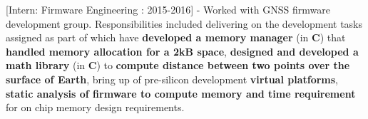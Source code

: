 \noindent \textcolor{ultramarine}{[Intern: Firmware Engineering : 2015-2016]} - Worked with GNSS firmware development group. Responsibilities included delivering on the development tasks assigned as part of which have \textbf{developed a memory manager} (in \textbf{C}) that \textbf{handled memory allocation for a 2kB space}, \textbf{designed and developed a math library} (in \textbf{C}) to \textbf{compute distance between two points over the surface of Earth}, bring up of pre-silicon development \textbf{virtual platforms}, \textbf{static analysis of firmware to compute memory and time requirement} for on chip memory design requirements.\\